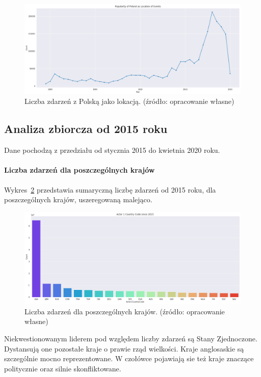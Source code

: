 \documentclass[11pt]{report}
\begin{document}
    \begin{figure}[!htp]
        \centering
        \includegraphics[width=\linewidth]{fig/PL/PLlocation.png}
        \caption{Liczba zdarzeń z Polską jako lokacją. (źródło: opracowanie własne)}
        \label{fig:PLlocation}
    \end{figure}

    \subsection{Analiza zbiorcza od 2015 roku}
    Dane pochodzą z przedziału od stycznia 2015 do kwietnia 2020 roku.

    \paragraph{Liczba zdarzeń dla poszczególnych krajów}
    Wykres~\ref{fig:GLOBALactor1} przedstawia sumaryczną liczbę zdarzeń od 2015 roku, dla poszczególnych krajów, uszeregowaną malejąco.
    \begin{figure}[!htp]
        \centering
        \includegraphics[width=\linewidth]{fig/GLOBAL/Actor1.png}
        \caption{Liczba zdarzeń dla poszczególnych krajów. (źródło: opracowanie własne)}
        \label{fig:GLOBALactor1}
    \end{figure}
    Niekwestionowanym liderem pod względem liczby zdarzeń są Stany Zjednoczone. Dystansują one pozostałe kraje o prawie rząd wielkości.
    Kraje anglosaskie są szczególnie mocno reprezentowane.
    W czołówce pojawiają sie też kraje znaczące politycznie oraz silnie skonfliktowane.
\end{document}
